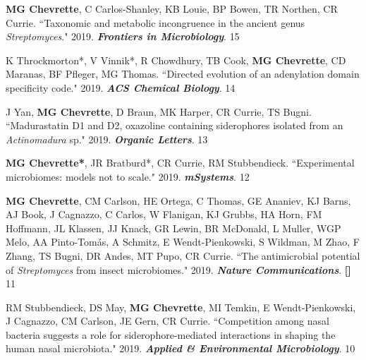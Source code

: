 \begin{cvpubs}
\cvpub
{\textbf{MG Chevrette}, C Carlos-Shanley, KB Louie, BP Bowen, TR Northen, CR Currie. ``Taxonomic and metabolic incongruence in the ancient genus \textit{Streptomyces}." 2019. \textit{\textbf{Frontiers in Microbiology}}. \textbf{\textit{}}}
{15}

\cvpub
{K Throckmorton*, V Vinnik*, R Chowdhury, TB Cook, \textbf{MG Chevrette}, CD Maranas, BF Pfleger, MG Thomas. ``Directed evolution of an adenylation domain specificity code." 2019. \textit{\textbf{ACS Chemical Biology}}. \textbf{\textit{}}}
{14}

\cvpub
{J Yan, \textbf{MG Chevrette}, D Braun, MK Harper, CR Currie, TS Bugni. ``Madurastatin D1 and D2, oxazoline containing siderophores isolated from an \textit{Actinomadura} sp." 2019. \textit{\textbf{Organic Letters}}. \textbf{\textit{}}}
{13}

\cvpub
{\textbf{MG Chevrette*}, JR Bratburd*, CR Currie, RM Stubbendieck. ``Experimental microbiomes: models not to scale." 2019. \textit{\textbf{mSystems}}. \textbf{\textit{}}}
{12}

\cvpub
{\textbf{MG Chevrette}, CM Carlson, HE Ortega, C Thomas, GE Ananiev, KJ Barns, AJ Book, J Cagnazzo, C Carlos, W Flanigan, KJ Grubbs, HA Horn, FM Hoffmann, JL Klassen, JJ Knack, GR Lewin, BR McDonald, L Muller, WGP Melo, AA Pinto-Tom\'{a}s, A Schmitz, E Wendt-Pienkowski, S Wildman, M Zhao, F Zhang, TS Bugni, DR Andes, MT Pupo, CR Currie. ``The antimicrobial potential of \textit{Streptomyces} from insect microbiomes." 2019. \textit{\textbf{Nature Communications}}. \textbf{\textit{}} \linebreak \textbf{[\textit{}]}}
{11}

\cvpub
{RM Stubbendieck, DS May, \textbf{MG Chevrette}, MI Temkin, E Wendt-Pienkowski, J Cagnazzo, CM Carlson, JE Gern, CR Currie. ``Competition among nasal bacteria suggests a role for siderophore-mediated interactions in shaping the human nasal microbiota." 2019. \textit{\textbf{Applied \& Environmental Microbiology}}. \textbf{\textit{}}}
{10}


\end{cvpubs}
